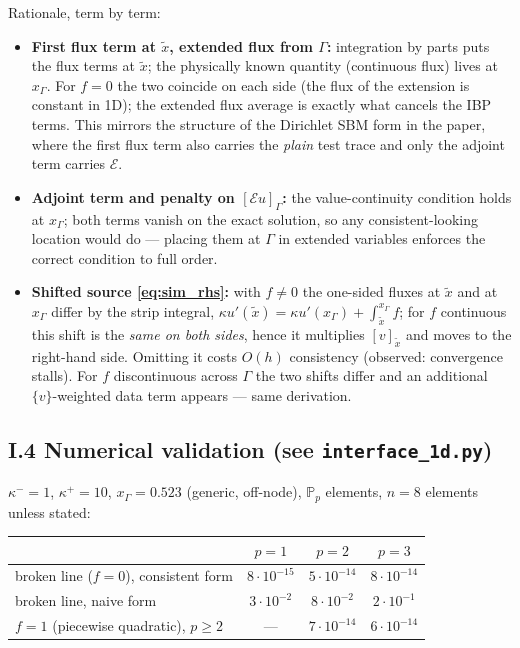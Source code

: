 Rationale, term by term:
\begin{itemize}
  \item \textbf{First flux term at $\tilde x$, extended flux from
        $\Gamma$:} integration by parts puts the flux terms at $\tilde x$;
        the physically known quantity (continuous flux) lives at
        $x_\Gamma$. For $f = 0$ the two coincide on each side (the flux of
        the extension is constant in 1D); the extended flux average is
        exactly what cancels the IBP terms. This mirrors the structure of
        the Dirichlet SBM form in the paper, where the first flux term
        also carries the \emph{plain} test trace and only the adjoint
        term carries $\mathcal E$.
  \item \textbf{Adjoint term and penalty on $[\mathcal E u]_\Gamma$:} the
        value-continuity condition holds at $x_\Gamma$; both terms vanish
        on the exact solution, so any consistent-looking location would
        do --- placing them at $\Gamma$ in extended variables enforces
        the correct condition to full order.
  \item \textbf{Shifted source \eqref{eq:sim_rhs}:} with $f \ne 0$ the
        one-sided fluxes at $\tilde x$ and at $x_\Gamma$ differ by the
        strip integral, $\kappa u'(\tilde x) = \kappa u'(x_\Gamma) +
        \int_{\tilde x}^{x_\Gamma} f$; for $f$ continuous this shift is
        the \emph{same on both sides}, hence it multiplies
        $[v]_{\tilde x}$ and moves to the right-hand side. Omitting it
        costs $O(h)$ consistency (observed: convergence stalls). For $f$
        discontinuous across $\Gamma$ the two shifts differ and an
        additional $\{v\}$-weighted data term appears --- same derivation.
\end{itemize}

\subsection*{I.4 Numerical validation (see \texttt{interface\_1d.py})}

$\kappa^- = 1$, $\kappa^+ = 10$, $x_\Gamma = 0.523$ (generic, off-node),
$\mathbb P_p$ elements, $n = 8$ elements unless stated:

\begin{center}
\begin{tabular}{lccc}
\hline
 & $p=1$ & $p=2$ & $p=3$ \\
\hline
broken line ($f=0$), consistent form & $8\cdot10^{-15}$ & $5\cdot10^{-14}$ & $8\cdot10^{-14}$ \\
broken line, naive form              & $3\cdot10^{-2}$ & $8\cdot10^{-2}$ & $2\cdot10^{-1}$ \\
$f=1$ (piecewise quadratic), $p\ge2$ &  --- & $7\cdot10^{-14}$ & $6\cdot10^{-14}$ \\
\hline
\end{tabular}
\end{center}

